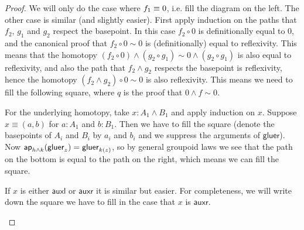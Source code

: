 \documentclass{article}
\renewcommand{\smash}{\wedge}
\newcommand{\tr}{\cdot}
\renewcommand{\o}{\ensuremath{\circ}}
\newcommand{\auxl}{\mathsf{auxl}}
\newcommand{\auxr}{\mathsf{auxr}}
\newcommand{\gluer}{\mathsf{gluer}}
\newcommand{\sy}{^{-1}}
\begin{document}
\begin{proof}
  We will only do the case where $f_1\equiv 0$, i.e. fill the diagram on the left. The other case is
  similar (and slightly easier). First apply induction on the paths that $f_2$, $g_1$ and $g_2$
  respect the basepoint. In this case $f_2\o0$ is definitionally equal to $0$, and the canonical
  proof that $f_2\o 0\sim0$ is (definitionally) equal to reflexivity. This means that the homotopy
  $(f_2 \o 0)\smash (g_2 \o g_1)\sim0\smash (g_2 \o g_1)$ is also equal to reflexivity, and also the
  path that $f_2 \smash g_2$ respects the basepoint is reflexivity, hence the homotopy
  $(f_2 \smash g_2)\o 0\sim0$ is also reflexivity. This means we need to fill the following square,
  where $q$ is the proof that $0\smash f\sim 0$.
\begin{center}
\end{center}

  For the underlying homotopy, take $x : A_1\smash B_1$ and apply induction on $x$. Suppose
  $x\equiv(a,b)$ for $a:A_1$ and $b:B_1$. Then we have to fill the square (denote the basepoints of
  $A_i$ and $B_i$ by $a_i$ and $b_i$ and we suppress the arguments of $\gluer$). Now
  $\mapfunc{h\smash k}(\gluer_z)=\gluer_{k(z)}$, so by general groupoid laws we see that the path on
  the bottom is equal to the path on the right, which means we can fill the square.
  \begin{center}
  \end{center}
  If $x$ is either $\auxl$ or $\auxr$ it is similar but easier. For completeness, we will write down the square we have to fill in the case that $x$ is $\auxr$.
  \begin{center}
  \end{center}


\end{proof}
\end{document}
